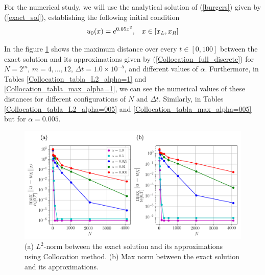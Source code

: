 	For the numerical study, we will use the analytical solution of (\ref {burgers}) given by (\ref{exact_sol}), establishing the following initial condition
	\begin{align}
		u_0 (x) = e^{0.05 x^2}, \hspace{3mm} x \in [x_L, x_R] 
	\end{align}
	
	In the figure \ref{Collocation_alphas} shows the maximum distance over every $t \in [0, 100]$ between the exact solution and its approximations given by (\ref{Collocation_full_discrete}) for $N = 2^m$, $m = 4, \dots, 12$, $\Delta t = 1.0 \times 10^{-5}$, and different values of $\alpha$. Furthermore, in Tables \ref{Collocation_tabla_L2_alpha=1} and \ref{Collocation_tabla_max_alpha=1}, we can see the numerical values ​​of these distances for different configurations of $N$ and $\Delta t$. Similarly, in Tables \ref{Collocation_tabla_L2_alpha=005} and \ref{Collocation_tabla_max_alpha=005} but for $\alpha = 0.005$.
	
	\begin{figure}[H]
		\centering
		\includegraphics[width=12cm]{Figures/Galerkin/Graphics/alphas_Error_N.png}
		\caption{(a) $L^2$-norm between the exact solution and its approximations using Collocation method. (b) Max norm between the exact solution and its approximations.}
		\label{Collocation_alphas}
	\end{figure}

